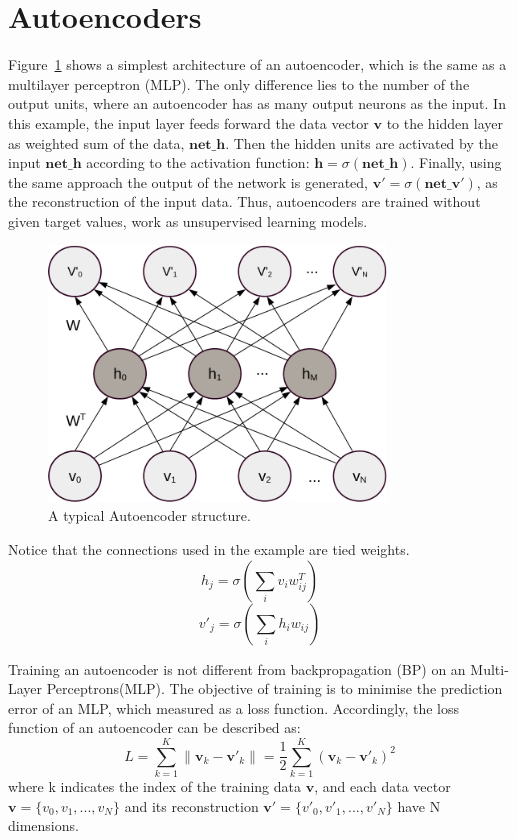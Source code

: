 \section{Autoencoders}
	Figure~\ref{fig:AE} shows a simplest architecture of an autoencoder, which is the same as a multilayer perceptron (MLP).
	The only difference lies to the number of the output units, where an autoencoder has as many output neurons as the input.
	In this example, the input layer feeds forward the data vector $\mathbf{v}$ to the hidden layer as weighted sum of the data, $\mathbf{net\_h}$.
	Then the hidden units are activated by the input $\mathbf{net\_h}$ according to the activation function: $\mathbf{h}=\sigma(\mathbf{net\_h})$.
	Finally, using the same approach the output of the network is generated, $\mathbf{v'}=\sigma(\mathbf{net\_v'})$, as the reconstruction of the input data.
	Thus, autoencoders are trained without given target values, work as unsupervised learning models.	
	\begin{figure}
		\centering
		\includegraphics[width=0.8\textwidth]{pics_ae/AE.pdf}
		\caption{A typical Autoencoder structure.}
		\label{fig:AE}
	\end{figure}
	
	Notice that the connections used in the example are tied weights.
	\begin{equation}
	h_j=\sigma(\sum_i v_i w^T_{ij})
	\end{equation}
	\begin{equation}
	v'_j=\sigma(\sum_i h_i w_{ij})
	\end{equation}
	
	Training an autoencoder is not different from backpropagation (BP) on an Multi-Layer Perceptrons(MLP).
	The objective of training is to minimise the prediction error of an MLP, which measured as a loss function.
	Accordingly, the loss function of an autoencoder can be described as:
	\begin{equation}
	L=\sum_{k=1}^{K}\|\mathbf{v}_{k}-\mathbf{v'}_{k}\|=\frac{1}{2}\sum_{k=1}^{K}(\mathbf{v}_{k}-\mathbf{v'}_{k})^{2}
	\end{equation}
	where k indicates the index of the training data $\mathbf{v}$, and each data vector $\mathbf{v}=\{v_0, v_1,...,v_N\}$ and its reconstruction $\mathbf{v'}=\{v'_0, v'_1,...,v'_N\}$ have N dimensions. 
	
